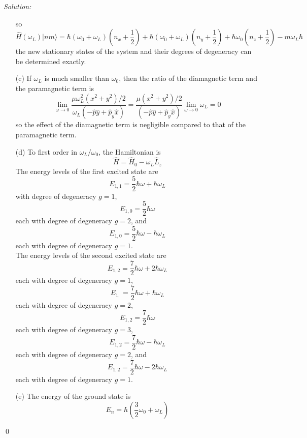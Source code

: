 \documentclass[10pt,a4paper]{article}
\newenvironment{sol}
    {\emph{Solution:}
    }
    {
    \qed
    }
\begin{document}
\begin{sol}
\begin{itemize}
\begin{equation}
\end{equation}
so
\begin{equation}
\hat{H}(\omega_L)|nm\rangle=\hbar(\omega_0+\omega_L)(n_x+\frac{1}{2})+\hbar(\omega_0+\omega_L)(n_y+\frac{1}{2})+\hbar\omega_0(n_z+\frac{1}{2})-m\omega_L\hbar
\end{equation}
the new stationary states of the system and their degrees of degeneracy can be determined exactly.
\item[(c)] If $\omega_L$ is much smaller than $\omega_0$, then the ratio of the diamagnetic term and the paramagnetic term is
\begin{equation}
\lim_{\omega\rightarrow0}\frac{\mu\omega_L^2(x^2+y^2)/2}{\omega_L(-\hat{p}\hat{y}+\hat{p}_y\hat{x})}=\frac{\mu(x^2+y^2)/2}{(-\hat{p}\hat{y}+\hat{p}_y\hat{x})}\lim_{\omega\rightarrow0}\omega_L=0
\end{equation}
so the effect of the diamagnetic term is negligible compared to that of the paramagnetic term.
\item[(d)] To first order in $\omega_L/\omega_0$, the Hamiltonian is
\begin{equation}
\hat{H}=\hat{H}_0-\omega_L\hat{L}_z
\end{equation}
The energy levels of the first excited state are
\begin{equation}
E_{1,1}=\frac{5}{2}\hbar\omega+\hbar\omega_L
\end{equation}
with degree of degeneracy $g=1$,
\begin{equation}
E_{1,0}=\frac{5}{2}\hbar\omega
\end{equation}
each with degree of degeneracy $g=2$, and
\begin{equation}
E_{1,0}=\frac{5}{2}\hbar\omega-\hbar\omega_L
\end{equation}
each with degree of degeneracy $g=1$.\\
The energy levels of the second excited state are
\begin{equation}
E_{1,2}=\frac{7}{2}\hbar\omega+2\hbar\omega_L
\end{equation}
each with degree of degeneracy $g=1$,
\begin{equation}
E_{1,}=\frac{7}{2}\hbar\omega+\hbar\omega_L
\end{equation}
each with degree of degeneracy $g=2$,
\begin{equation}
E_{1,2}=\frac{7}{2}\hbar\omega
\end{equation}
each with degree of degeneracy $g=3$,
\begin{equation}
E_{1,2}=\frac{7}{2}\hbar\omega-\hbar\omega_L
\end{equation}
each with degree of degeneracy $g=2$, and
\begin{equation}
E_{1,2}=\frac{7}{2}\hbar\omega-2\hbar\omega_L
\end{equation}
each with degree of degeneracy $g=1$.\\
\item[(e)] The energy of the ground state is
\begin{equation}
E_n=\hbar(\frac{3}{2}\omega_0+\omega_L)
\end{equation}
\end{itemize}
\end{sol}
\end{document}

